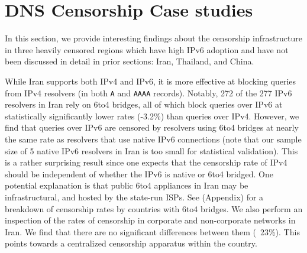 \section{DNS Censorship Case studies}
\label{sec:cases}
In this section, we provide interesting findings about the censorship
infrastructure in three heavily censored regions which have high IPv6 adoption
and have not been discussed in detail in prior sections: Iran, Thailand, and
China.

% 

While Iran supports both IPv4 and IPv6, it is more effective at blocking queries
from IPv4 resolvers (in both \texttt{A} and \texttt{AAAA} records). Notably, 272
of the 277 IPv6 resolvers in Iran rely on 6to4 bridges, all of which block
queries over IPv6 at statistically significantly lower rates (-3.2\%) than
queries over IPv4. 
%
However, we find that queries over IPv6 are censored by resolvers using 6to4
bridges at nearly the same rate as resolvers that use native IPv6 connections
(note that our sample size of 5 native IPv6 resolvers in Iran is too small for
statistical validation). This is a rather surprising result since one expects
that the censorship rate of IPv4 should be independent of whether the IPv6 is
native or 6to4 bridged. One potential explanation is that public 6to4
appliances in Iran may be infrastructural, and hosted by the state-run ISPs.
See  (Appendix) for a breakdown of
censorship rates by countries with 6to4 bridges.
%
We also perform an inspection of the rates of censorship in corporate and
non-corporate networks in Iran. We find that there are no significant
differences between them (~23\%). This points towards a centralized censorship
apparatus within the country.

